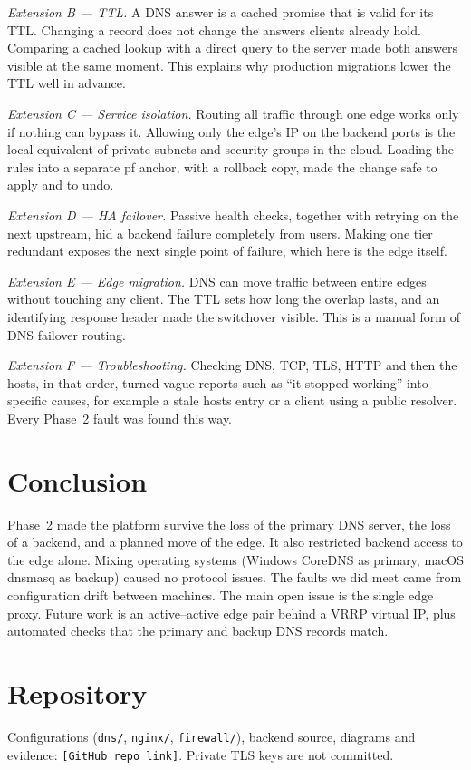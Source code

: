 \documentclass[conference]{IEEEtran}
\begin{document}
\textit{Extension B --- TTL.} A DNS answer is a cached promise that is valid for its TTL. Changing a record does not change the answers clients already hold. Comparing a cached lookup with a direct query to the server made both answers visible at the same moment. This explains why production migrations lower the TTL well in advance.

\textit{Extension C --- Service isolation.} Routing all traffic through one edge works only if nothing can bypass it. Allowing only the edge's IP on the backend ports is the local equivalent of private subnets and security groups in the cloud. Loading the rules into a separate pf anchor, with a rollback copy, made the change safe to apply and to undo.

\textit{Extension D --- HA failover.} Passive health checks, together with retrying on the next upstream, hid a backend failure completely from users. Making one tier redundant exposes the next single point of failure, which here is the edge itself.

\textit{Extension E --- Edge migration.} DNS can move traffic between entire edges without touching any client. The TTL sets how long the overlap lasts, and an identifying response header made the switchover visible. This is a manual form of DNS failover routing.

\textit{Extension F --- Troubleshooting.} Checking DNS, TCP, TLS, HTTP and then the hosts, in that order, turned vague reports such as ``it stopped working'' into specific causes, for example a stale hosts entry or a client using a public resolver. Every Phase~2 fault was found this way.

\section{Conclusion}
Phase~2 made the platform survive the loss of the primary DNS server, the loss of a backend, and a planned move of the edge. It also restricted backend access to the edge alone. Mixing operating systems (Windows CoreDNS as primary, macOS dnsmasq as backup) caused no protocol issues. The faults we did meet came from configuration drift between machines. The main open issue is the single edge proxy. Future work is an active--active edge pair behind a VRRP virtual IP, plus automated checks that the primary and backup DNS records match.

\section*{Repository}
Configurations (\texttt{dns/}, \texttt{nginx/}, \texttt{firewall/}), backend source, diagrams and evidence: \texttt{[GitHub repo link]}. Private TLS keys are not committed.
\end{document}
